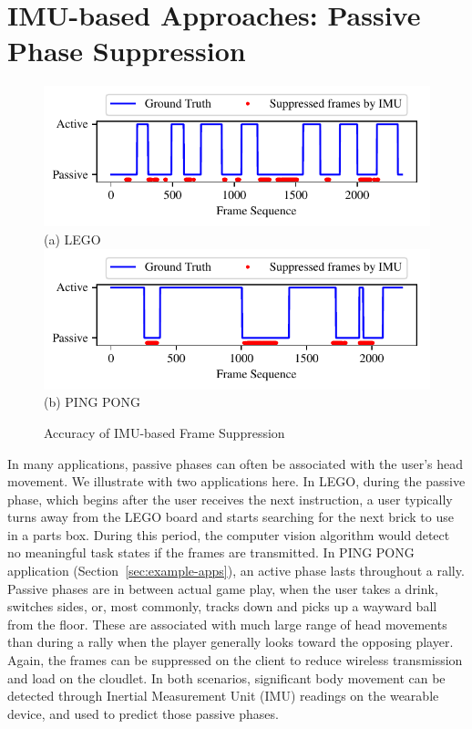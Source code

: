 \section{IMU-based Approaches: Passive Phase Suppression}


\begin{figure}[h]
\begin{center}
\includegraphics[width=.9\linewidth]{FIGS/fig-imu-trace-lego.pdf}\\
{\small (a) LEGO}
\includegraphics[width=.9\linewidth]{FIGS/fig-imu-trace-pingpong.pdf}\\
{\small (b) PING PONG}
\end{center}
\vspace{-0.1in}
\caption{\small Accuracy of IMU-based Frame Suppression}
\label{fig:imu-trace-example}
\vspace{-0.1in}
\end{figure}

In many applications, passive phases can often be associated with the user's
head movement. We illustrate with two applications here. In LEGO, during the
passive phase, which begins after the user receives the next instruction, a user
typically turns away from the LEGO board and starts searching for the next brick
to use in a parts box. During this period, the computer vision algorithm would
detect no meaningful task states if the frames are transmitted.  In PING PONG
application (Section~\ref{sec:example-apps}), an active phase lasts
throughout a rally.  Passive phases are in between actual game play, when the
user takes a drink, switches sides, or, most commonly, tracks down and picks up
a wayward ball from the floor. These are associated with much large range of
head movements than during a rally when the player generally looks toward the
opposing player.  Again, the frames can be suppressed on the client to reduce
wireless transmission and load on the cloudlet.  In both scenarios, significant
body movement can be detected through Inertial Measurement Unit (IMU) readings
on the wearable device, and used to predict those passive phases.

